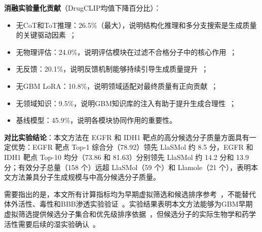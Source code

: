 \textbf{消融实验量化贡献}（DrugCLIP均值下降百分比）：
\begin{itemize}
    \item 无CoT和ToT推理：26.5\%（最大），说明结构化推理和多分支搜索是生成质量的关键驱动因素~\cite{Wei2022,Yao2023}；
    \item 无物理评估：24.0\%，说明评估模块在过滤不合格分子中的核心作用~\cite{Trott2010}；
    \item 无反馈：20.1\%，说明反馈机制能够持续引导生成质量提升~\cite{Yao2023}；
    \item 无GBM LoRA：10.8\%，说明领域适配对最终质量有正向贡献~\cite{hu2022lora}；
    \item 无领域知识：9.5\%，说明GBM知识库的注入有助于提升生成合理性~\cite{jin2025effective}；
    \item 基线模型：45.9\%，说明各模块协同作用的重要性。
\end{itemize}

\textbf{对比实验结论}：本文方法在 EGFR 和 IDH1 靶点的高分候选分子质量方面具有一定优势：EGFR 靶点 Top-1 综合分（78.92）领先 LlaSMol 约 8.5 分，EGFR 和 IDH1 靶点 Top-10 均分（73.86 和 81.63）分别领先 LlaSMol 约 14.2 分和 13.9 分；有效分子总量（158 个）远超 LlaSMol（59 个）和 Llamole（21 个），表明本文方法兼具分子生成规模与中高分候选分子质量。

需要指出的是，本文所有计算指标均为早期虚拟筛选和候选排序参考~\cite{Trott2010,Clark2000,Gao2023}，不能替代体外活性、毒性和BBB渗透实验验证~\cite{Trott2010,Pardridge2012}。实验结果表明本文方法能够为GBM早期虚拟筛选提供候选分子集合和优先级排序依据~\cite{Li2025DrugPilot}，但候选分子的实际生物学和药学活性需要后续的湿实验确认~\cite{Li2025DrugPilot}。
